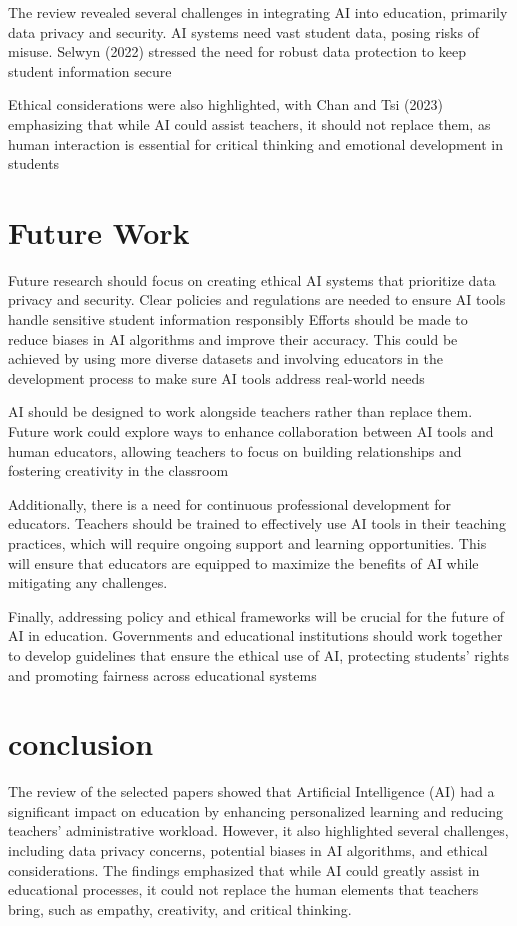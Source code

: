 \documentclass[conference]{IEEEtran}
\begin{document}
The review revealed several challenges in integrating AI into education, primarily data privacy and security. AI systems need vast student data, posing risks of misuse. Selwyn (2022) stressed the need for robust data protection to keep student information secure \cite{r4}

Ethical considerations were also highlighted, with Chan and Tsi (2023) emphasizing that while AI could assist teachers, it should not replace them, as human interaction is essential for critical thinking and emotional development in students \cite{r10}

\section{Future Work}

Future research should focus on creating ethical AI systems that prioritize data privacy and security. Clear policies and regulations are needed to ensure AI tools handle sensitive student information responsibly \cite{r8} Efforts should be made to reduce biases in AI algorithms and improve their accuracy. This could be achieved by using more diverse datasets and involving educators in the development process to make sure AI tools address real-world needs \cite{r3} \cite{r6} 

AI should be designed to work alongside teachers rather than replace them. Future work could explore ways to enhance collaboration between AI tools and human educators, allowing teachers to focus on building relationships and fostering creativity in the classroom\cite{r6} \cite{r10} 

Additionally, there is a need for continuous professional development for educators. Teachers should be trained to effectively use AI tools in their teaching practices, which will require ongoing support and learning opportunities. This will ensure that educators are equipped to maximize the benefits of AI while mitigating any challenges.

Finally, addressing policy and ethical frameworks will be crucial for the future of AI in education. Governments and educational institutions should work together to develop guidelines that ensure the ethical use of AI, protecting students' rights and promoting fairness across educational systems

\section{conclusion}
The review of the selected papers showed that Artificial Intelligence (AI) had a significant impact on education by enhancing personalized learning and reducing teachers' administrative workload.
However, it also highlighted several challenges, including data privacy concerns, potential biases in AI algorithms, and ethical considerations. The findings emphasized that while AI could greatly assist in educational processes, it could not replace the human elements that teachers bring, such as empathy, creativity, and critical thinking.
\end{document}
